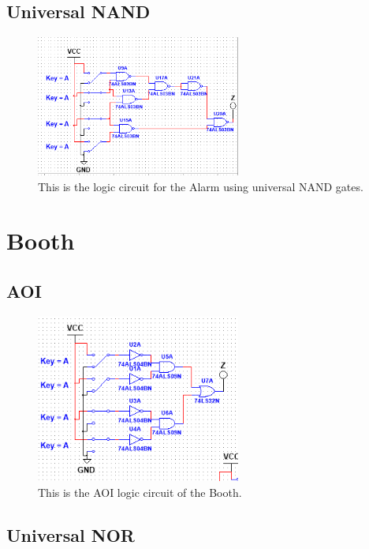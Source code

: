 \documentclass{article}
\begin{document}
\subsection{Universal NAND}

\begin{figure}[!htb]
\centering
\includegraphics[width=0.6\textwidth]{images/AlarmUniversalNAND.PNG}
\caption{\label{fig:alarm nand}This is the logic circuit for the Alarm using universal NAND gates.}
\end{figure}

\section{Booth}

\subsection{AOI}

\begin{figure}[!htb]
\centering
\includegraphics[width=0.6\textwidth]{images/BoothAOI.PNG}
\caption{\label{fig:booth aoi}This is the AOI logic circuit of the Booth.}
\end{figure}

\newpage

\subsection{Universal NOR}
\end{document}
